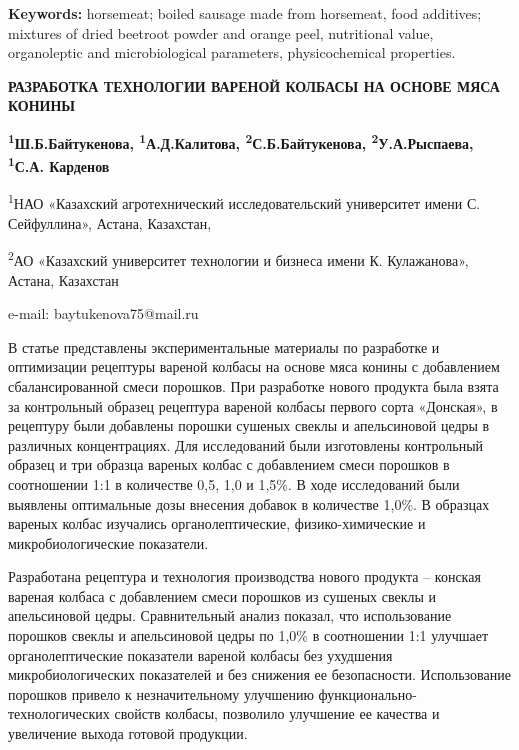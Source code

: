 {\bfseries Keywords:} horsemeat; boiled sausage made from horsemeat, food
additives; mixtures of dried beetroot powder and orange peel,
nutritional value, organoleptic and microbiological parameters,
physicochemical properties.

\begin{articleheader}
{\bfseries РАЗРАБОТКА ТЕХНОЛОГИИ ВАРЕНОЙ КОЛБАСЫ НА ОСНОВЕ МЯСА КОНИНЫ}

{\bfseries
\textsuperscript{1}Ш.Б.Байтукенова\textsuperscript{\envelope },
\textsuperscript{1}А.Д.Калитова,
\textsuperscript{2}С.Б.Байтукенова,
\textsuperscript{2}У.А.Рыспаева,
\textsuperscript{1}С.А. Карденов
}
\end{articleheader}

\begin{affiliation}
\textsuperscript{1}НАО «Казахский агротехнический исследовательский университет имени С. Сейфуллина», Астана, Казахстан,

\textsuperscript{2}АО «Казахский университет технологии и бизнеса имени К. Кулажанова», Астана, Казахстан

e-mail: baytukenova75@mail.ru
\end{affiliation}

В статье представлены экспериментальные материалы по разработке и
оптимизации рецептуры вареной колбасы на основе мяса конины с
добавлением сбалансированной смеси порошков. При разработке нового
продукта была взята за контрольный образец рецептура вареной колбасы
первого сорта «Донская», в рецептуру были добавлены порошки сушеных
свеклы и апельсиновой цедры в различных концентрациях. Для исследований
были изготовлены контрольный образец и три образца вареных колбас с
добавлением смеси порошков в соотношении 1:1 в количестве 0,5, 1,0 и
1,5\%. В ходе исследований были выявлены оптимальные дозы внесения
добавок в количестве 1,0\%. В образцах вареных колбас изучались
органолептические, физико-химические и микробиологические показатели.

Разработана рецептура и технология производства нового продукта --
конская вареная колбаса с добавлением смеси порошков из сушеных свеклы и
апельсиновой цедры. Сравнительный анализ показал, что использование
порошков свеклы и апельсиновой цедры по 1,0\% в соотношении 1:1 улучшает
органолептические показатели вареной колбасы без ухудшения
микробиологических показателей и без снижения ее безопасности.
Использование порошков привело к незначительному улучшению
функционально-технологических свойств колбасы, позволило улучшение ее
качества и увеличение выхода готовой продукции.

